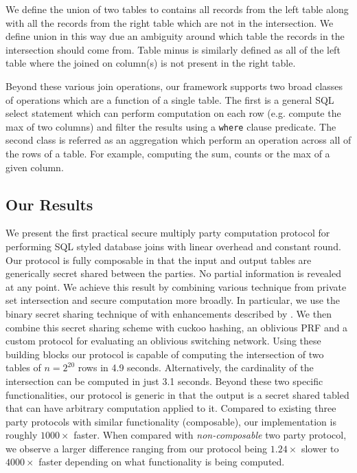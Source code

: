We define the union of two tables to contains all records from the left table along with all the records from the right table which are not in the intersection. We define union in this way due an ambiguity around which table the records in the intersection should come from. Table minus is similarly defined as all of the left table where the joined on column(s) is not present in the right table. 

Beyond these various join operations, our framework supports two broad classes of operations which are a function of a single table. The first is a general SQL select statement which can perform computation on each row (e.g. compute the max of two columns) and filter the results using a \texttt{where} clause predicate. The second class is referred as an aggregation which perform an operation across all of the rows of a table. For example, computing the sum, counts or the max of a given column. 



\subsection{Our Results}

We present the first practical secure multiply party computation protocol for performing SQL styled database joins with linear overhead and constant round. Our protocol is fully composable in that the input and output tables are generically secret shared between the parties. No partial information is revealed at any point. We achieve this result by combining various technique from private set intersection and secure computation more broadly. In particular, we use the binary secret sharing technique of \cite{highthroughput} with enhancements described by \cite{aby3}. We then combine this secret sharing scheme with cuckoo hashing\cite{usenix:PSZ14}, an oblivious PRF\cite{lowmc} and a custom protocol for evaluating an oblivious switching network\cite{MS13}. Using these building blocks our protocol is capable of computing the intersection of two tables of $n=2^{20}$ rows in 4.9 seconds.  Alternatively, the cardinality of the intersection can be computed in just 3.1 seconds. Beyond these two specific functionalities, our protocol is generic in that the output is a secret shared tabled that can have arbitrary computation applied to it. Compared to existing three party protocols with similar functionality (composable), our implementation is roughly $1000\times$ faster. When compared with \emph{non-composable} two party protocol, we observe a larger difference ranging from our protocol being $1.24\times$ slower to $4000\times$ faster depending on what functionality is being computed. 


